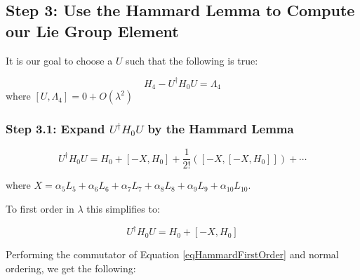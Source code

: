 \documentclass{article}
\begin{document}
\subsection{Step 3: Use the Hammard Lemma to Compute our Lie Group Element}

It is our goal to choose a $U$ such that the following is true:

\begin{equation}
  H_{4} - U^{\dagger}H_{0}U = \Lambda_{4}
\label{eqDefinitionOfLambdaOperator}
\end{equation}
where $[U,\Lambda_{4}] = 0 + O(\lambda^{2})$

\subsubsection{Step 3.1: Expand $U^{\dagger}H_{0}U$ by the Hammard Lemma}
\label{ssecTransformation}

\begin{equation}
U^{\dagger}H_{0}U = H_{0} + [-X,H_{0}] + \frac{1}{2!}([-X,[-X,H_{0}]]) + {\cdots}
\end{equation}

where $X = \alpha_{5}L_{5}+\alpha_{6}L_{6}+\alpha_{7}L_{7}+\alpha_{8}L_{8}+\alpha_{9}L_{9}+\alpha_{10}L_{10}$.

To first order in $\lambda$ this simplifies to:

\begin{equation}
U^{\dagger}H_{0}U = H_{0} + [-X,H_{0}]
\label{eqHammardFirstOrder}
\end{equation}

Performing the commutator of Equation \ref{eqHammardFirstOrder} and normal ordering, we get the following:
\end{document}
